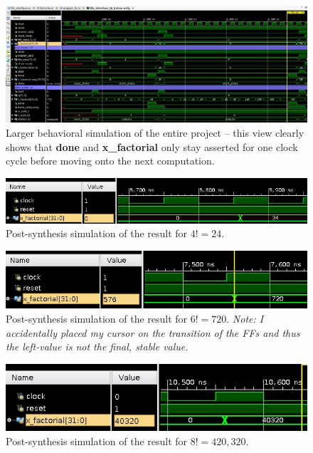 \documentclass[a4paper, 12pt]{article}
\begin{document}
\begin{landscape}
\begin{figure}[H]
\centering
\includegraphics[width=0.80\paperheight, keepaspectratio=true]{Sources/fifo-interface-behav.jpg}
\caption{Larger behavioral simulation of the entire project -- this view clearly shows that \textbf{done} and \textbf{x\_factorial} only stay asserted for one clock cycle before moving onto the next computation.}
\label{fig:behav-sim}
\end{figure}

\begin{figure}[H]
\centering
\includegraphics[width=0.80\paperheight, keepaspectratio=true]{Sources/post-impl-4.jpg}
\caption{Post-synthesis simulation of the result for $4!=24$.}
\end{figure}

\begin{figure}[H]
\centering
\includegraphics[width=0.80\paperheight, keepaspectratio=true]{Sources/post-impl-6.jpg}
\caption{Post-synthesis simulation of the result for $6!=720$. \textit{Note: I accidentally placed my cursor on the transition of the FFs and thus the left-value is not the final, stable value.}}
\end{figure}

\begin{figure}[H]
\centering
\includegraphics[width=0.80\paperheight, keepaspectratio=true]{Sources/post-impl-8.jpg}
\caption{Post-synthesis simulation of the result for $8!=420,320$.}
\end{figure}


\end{landscape}
\end{document}
